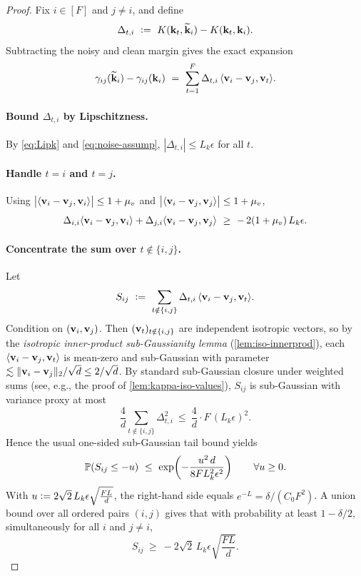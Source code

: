 \begin{proof}
Fix $i\in[F]$ and $j\neq i$, and define
\[
\Delta_{t,i}\ \defeq\ K(\vk_{t},\widetilde{\vk}_{i})-K(\vk_{t},\vk_{i}).
\]
Subtracting the noisy and clean margin gives the exact expansion
\begin{equation}
\gamma_{ij}(\widetilde{\vk}_{i})-\gamma_{ij}(\vk_{i})\ =\ \sum_{t=1}^F \Delta_{t,i}\,\ip{\vv_{i}-\vv_j}{\vv_t}.
\label{eq:margin-diff-expand}
\end{equation}

\paragraph{Bound $\Delta_{t,i}$ by Lipschitzness.}
By \cref{eq:Lipk} and \cref{eq:noise-assump}, $|\Delta_{t,i}|\le L_{k}\epsilon$ for all $t$.

\paragraph{Handle $t=i$ and $t=j$.}
Using $\big|\langle {{\mathbf{v}}_{i}-{\mathbf{v}}_j}, {{\mathbf{v}}_i} \rangle\big|\le 1+\mu_{v}$ and $\big|\langle {{\mathbf{v}}_{i}-{\mathbf{v}}_j}, {{\mathbf{v}}_j} \rangle\big|\le 1+\mu_{v}$,
\[
\Delta_{i,i}\langle {{\mathbf{v}}_{i}-{\mathbf{v}}_j}, {{\mathbf{v}}_i} \rangle+\Delta_{j,i}\langle {{\mathbf{v}}_{i}-{\mathbf{v}}_j}, {{\mathbf{v}}_j} \rangle
\ \ge\ -\,2(1+\mu_{v})\,L_{k}\epsilon.
\]

\paragraph{Concentrate the sum over $t\notin\{i,j\}$.}
Let
\[
S_{ij}\ \defeq\ \sum_{t\notin\{i,j\}} \Delta_{t,i}\,\ip{\vv_{i}-\vv_j}{\vv_t}.
\]
Condition on $({\mathbf{v}}_{i},{\mathbf{v}}_{j})$. Then $({\mathbf{v}}_{t})_{t\notin\{i,j\}}$ are independent isotropic vectors, so by the
\emph{isotropic inner-product sub-Gaussianity lemma} (\cref{lem:iso-innerprod}),
each $\langle {{\mathbf{v}}_{i}-{\mathbf{v}}_j}, {{\mathbf{v}}_t} \rangle$ is mean-zero and sub-Gaussian with parameter
$\lesssim \|{\mathbf{v}}_{i}-{\mathbf{v}}_{j}\|_{2}/\sqrt{d}\le 2/\sqrt{d}$.
By standard sub-Gaussian closure under weighted sums (see, e.g., the proof of \cref{lem:kappa-iso-values}),
$S_{ij}$ is sub-Gaussian with variance proxy at most
\[
\frac{4}{d}\sum_{t\notin\{i,j\}}\Delta_{t,i}^2
\ \le\ \frac{4}{d}\cdot F\,(L_{k}\epsilon)^2.
\]
Hence the usual one-sided sub-Gaussian tail bound yields
\[
\mathbb{P}\!\left(S_{ij}\le -u\right)
\ \le\ \exp\!\left(-\frac{u^2\,d}{8FL_{k}^2\epsilon^2}\right)
\qquad \forall u\ge 0.
\]
With $u\vcentcolon= 2\sqrt{2}\,L_{k}\epsilon\sqrt{\tfrac{FL}{d}}$, the right-hand side equals $e^{-L}=\delta/(C_0F^2)$.
A union bound over all ordered pairs $(i,j)$ gives that with probability at least $1-\delta/2$,
simultaneously for all $i$ and $j\neq i$,
\[
S_{ij}\ \ge\ -2\sqrt{2}\,L_{k}\epsilon\sqrt{\frac{FL}{d}}.
\]


\end{proof}

